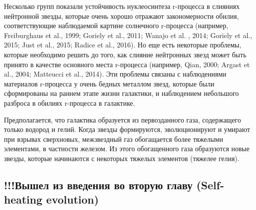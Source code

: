 \documentclass[%
bachelor,    %
natbib,      %
subf,        %
href,        %
colorlinks,  %
]{disser}
\begin{document}
Несколько групп показали устойчивость нуклеосинтеза r-процесса в слияниях нейтронной звезды, которые очень хорошо отражают закономерности обилия, соответствующие наблюдаемой картине солнечного r-процесса (например, Freiburghaus et al., 1999; Goriely et al., 2011; Wanajo et al. , 2014; Goriely et al., 2015; Just et al., 2015; Radice et al., 2016). Но еще есть некоторые проблемы, которые необходимо решить до того, как слияние нейтронных звезд может быть принято в качестве основного места r-процесса (например, Qian, 2000; Argast et al., 2004; Matteucci et al., 2014). Эти проблемы связаны с наблюдениями материалов r-процесса у очень бедных металлом звезд, которые были сформированы на раннем этапе жизни галактики, и наблюдением небольшого разброса в обилиях r-процесса в галактике.

Предполагается, что галактика образуется из первозданного газа, содержащего только водород и гелий. Когда звезды формируются, эволюционируют и умирают при взрывах сверхновых, межзвездный газ обогащается более тяжелыми элементами, в частности железом. Из этого обогащенного газа образуются новые звезды, которые начинаются с некоторых тяжелых элементов (тяжелее гелия).


\subsection{!!!Вышел из введения во вторую главу (Self-heating evolution)}
\end{document}

